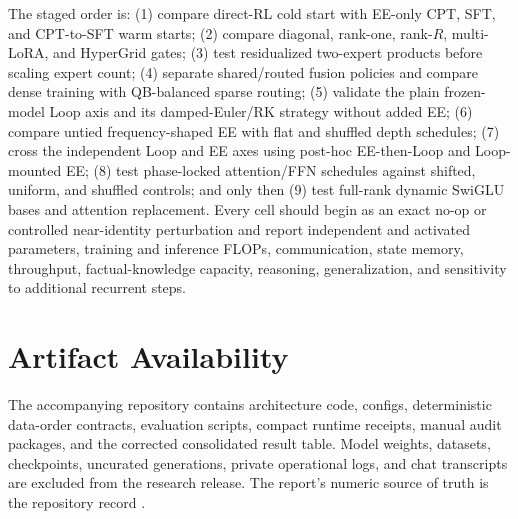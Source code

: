 \documentclass[10pt]{article}
\begin{document}
The staged order is: (1) compare direct-RL cold start with EE-only CPT, SFT,
and CPT-to-SFT warm starts; (2) compare diagonal, rank-one, rank-$R$, multi-LoRA,
and HyperGrid gates; (3) test residualized two-expert products before scaling
expert count; (4) separate shared/routed fusion policies and compare dense
training with QB-balanced sparse routing; (5) validate the plain frozen-model
Loop axis and its damped-Euler/RK strategy without added EE; (6) compare
untied frequency-shaped EE with flat and shuffled depth schedules; (7) cross
the independent Loop and EE axes using post-hoc EE-then-Loop and Loop-mounted
EE; (8) test phase-locked attention/FFN schedules against shifted, uniform, and
shuffled controls; and only then (9) test full-rank dynamic SwiGLU bases and
attention replacement.  Every cell should
begin as an exact no-op or controlled
near-identity perturbation and report independent and activated parameters,
training and inference FLOPs, communication, state memory, throughput,
factual-knowledge capacity, reasoning, generalization, and sensitivity to
additional recurrent steps.

\section*{Artifact Availability}

The accompanying repository contains architecture code, configs, deterministic
data-order contracts, evaluation scripts, compact runtime receipts, manual
audit packages, and the corrected consolidated result table.  Model weights,
datasets, checkpoints, uncurated generations, private operational logs, and
chat transcripts are excluded from the research release.  The report's numeric
source of truth is the repository record
.



\end{document}
